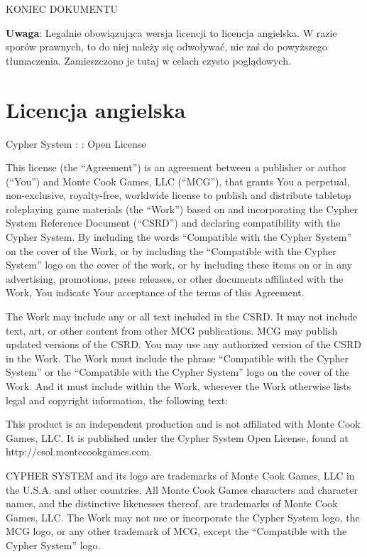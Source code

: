 KONIEC DOKUMENTU

{ \color{red} \textbf{Uwaga}}: Legalnie obowiązująca wersja licencji to licencja angielska. W razie sporów prawnych, to do niej należy się odwoływać, nie zaś do powyższego tłumaczenia. Zamieszczono je tutaj w celach czysto poglądowych.

\section{Licencja angielska}

Cypher System : : Open License

This license (the “Agreement”) is an agreement between a publisher or author (“You”) and Monte Cook Games, LLC (“MCG”), that grants You a perpetual, non-exclusive, royalty-free, worldwide license to publish and distribute tabletop roleplaying game materials (the “Work”) based on and incorporating the Cypher System Reference Document (“CSRD”) and declaring compatibility with the Cypher System. By including the words “Compatible with the Cypher System” on the cover of the Work, or by including the “Compatible with the Cypher System” logo on the cover of the work, or by including these items on or in any advertising, promotions, press releases, or other documents affiliated with the Work, You indicate Your acceptance of the terms of this Agreement.

The Work may include any or all text included in the CSRD. It may not include text, art, or other content from other MCG publications. MCG may publish updated versions of the CSRD. You may use any authorized version of the CSRD in the Work.
The Work must include the phrase “Compatible with the Cypher System” or the “Compatible with the Cypher System” logo on the cover of the Work. And it must include within the Work, wherever the Work otherwise lists legal and copyright information, the following text:

\begin{displayquote}
This product is an independent production and is not affiliated with Monte Cook Games, LLC. It is published under the Cypher System Open License, found at http://csol.montecookgames.com.

CYPHER SYSTEM and its logo are trademarks of Monte Cook Games, LLC in the U.S.A. and other countries. All Monte Cook Games characters and character names, and the distinctive likenesses thereof, are trademarks of Monte Cook Games, LLC.
The Work may not use or incorporate the Cypher System logo, the MCG logo, or any other trademark of MCG, except the “Compatible with the Cypher System” logo.
\end{displayquote}

